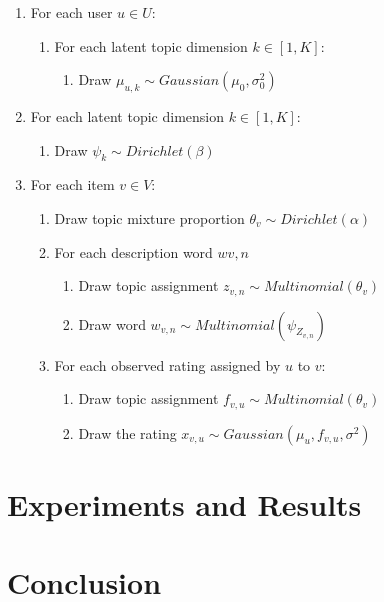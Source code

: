 \documentclass[10pt,conference]{IEEEtran}
\begin{document}
\begin{enumerate}

	\bigskip 
	\item For each user $u \in U$:
		\medskip
		\begin{enumerate}
			\item For each latent topic dimension $k \in [1, K]$:
				\smallskip
				\begin{enumerate}
					\item Draw $\mu_{u,k} \sim Gaussian(\mu_0, \sigma^2_0)$
				\end{enumerate}
		\end{enumerate}
	\bigskip 
	\item For each latent topic dimension $k \in [1, K]:$
		\medskip
		\begin{enumerate}
			\item Draw $\psi_k \sim Dirichlet(\beta)$
			\smallskip
		\end{enumerate}
	\bigskip 
	\item For each item $v \in V$:
		\medskip
		\begin{enumerate}
			\item Draw topic mixture proportion $\theta_v \sim Dirichlet(\alpha)$
			\smallskip 
			\item For each description word $w{v,n}$
			\smallskip
			\begin{enumerate}
				\item Draw topic assignment $z_{v,n} \sim Multinomial(\theta_v)$
				\item Draw word $w_{v,n} \sim Multinomial(\psi_{Z_{v,n}})$
			\end{enumerate}
			\item For each observed rating assigned by $u$ to $v$:
			\begin{enumerate}
				\item Draw topic assignment $f_{v,u} \sim Multinomial(\theta_v)$
				\item Draw the rating $x_{v,u} \sim Gaussian(\mu_u, f_{v,u}, \sigma^2)$
			\end{enumerate}

		\end{enumerate}
	\bigskip 
\end{enumerate}

\section{Experiments and Results}

\section{Conclusion}

\newpage



\end{document}
